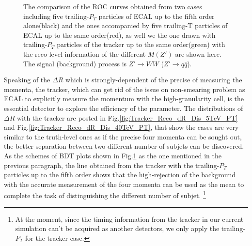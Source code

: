 \begin{figure}
\begin{center}
\end{center}
\caption{The comparison of the ROC curves obtained from two cases including five trailing-$P_{T}$ particles of ECAL up to the fifth order alone(black) and the ones accompanied by five trailing-T particles of ECAL up to the same order(red), as well we the one drawn with trailing-$P_{T}$ particles of the tracker up to the same order(green) with the reco-level information of the different $M(Z')$ are shown here. The signal (background) process is $Z'\rightarrow WW$ ($Z' \rightarrow q\bar{q}$). \label{fig:Reco_dR_BDT}}
\end{figure}

Speaking of the $\Delta R$ which is strongly-dependent of the precise of measuring the momenta, the tracker, which can get rid of the issue on non-smearing problem as ECAL to explicitly measure the momentum with the high-granularity cell, is the essential detector to explore the efficiency of the parameter. The distributions of $\Delta R$ with the tracker are posted in Fig.\ref{fig:Tracker_Reco_dR_Dis_5TeV_PT} and Fig.\ref{fig:Tracker_Reco_dR_Dis_40TeV_PT}, that show the cases are very similar to the truth-level ones as if the precise four momenta can be sought out, the better separation between two different number of subjets can be discovered. As the schemes of BDT plots shown in Fig.\ref{fig:Reco_dR_BDT} as the one mentioned in the previous paragraph, the line obtained from the tracker with the trailing-$P_{T}$ particles up to the fifth order shows that the high-rejection of the background with the accurate measurement of the four momenta can be used as the mean to complete the task of distinguishing the different number of subjet. \footnote{At the moment, since the timing information from the tracker in our current simulation can't be acquired as another detectors, we only apply the trailing-$P_{T}$ for the tracker case.}\\

